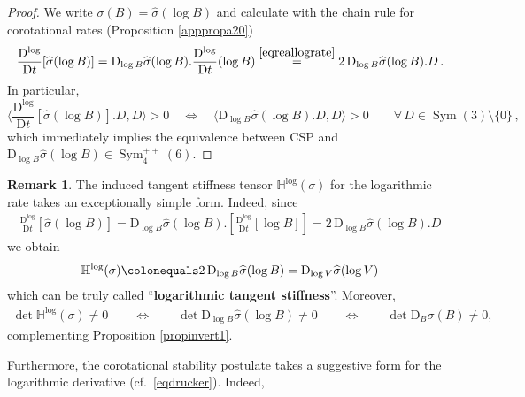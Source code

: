 \documentclass[10pt]{article}
\newcounter{theoremCounter}
\numberwithin{theoremCounter}{section}
\theoremstyle{plain}
\theoremstyle{definition}
\newtheorem{rem}[theoremCounter]{Remark}
\newcommand{\DD}{\mathrm{D}}
\DeclareMathOperator{\Sym}{Sym}
\def\H{\mathbb{H}}
\numberwithin{equation}{section}
\begin{document}
%
\begin{proof}
We write $\sigma(B) = \widehat \sigma(\log B)$ and calculate with the chain rule for corotational rates (Proposition \ref{apppropa20})
	\begin{align}
	\frac{\DD^{\log}}{\DD t}[\widehat \sigma(\log B)] = \DD_{\log B} \widehat \sigma (\log B). \frac{\DD^{\log}}{\DD t}(\log B) \overset{\eqref{eqreallograte}}{=} 2 \, \DD_{\log B} \widehat \sigma(\log B). D \, .
	\end{align}
In particular,
	\begin{equation}
	\langle \frac{\DD^{\log}}{\DD t}[\widehat \sigma(\log B)].D, D \rangle > 0 \quad\iff\quad \langle \DD_{\log B} \widehat \sigma(\log B). D , D \rangle > 0 \qquad\forall \, D \in \Sym(3) \! \setminus \! \{0\}
	\,,
	\end{equation}
which immediately implies the equivalence between CSP and $\DD_{\log B} \widehat \sigma(\log B) \in \Sym^{++}_4(6)$.
\end{proof}
%
\begin{rem}
The induced tangent stiffness tensor $\H^{\log}(\sigma)$ for the logarithmic rate takes an exceptionally simple form. Indeed, since
	\begin{align}
	\frac{\DD^{\log}}{\DD t}[\widehat \sigma(\log B)] = \DD_{\log B} \widehat \sigma(\log B).\!\left[ \frac{\DD^{\log}}{\DD t} [\log B] \right] = 2 \, \DD_{\log B} \widehat \sigma(\log B). D
	\end{align}
we obtain
	\begin{align}
	\H^{\log}(\sigma)\colonequals 2 \, \DD_{\log B} \widehat \sigma(\log B) = \DD_{\log V} \widehat \sigma(\log V)
	\end{align}
which can be truly called ``\textbf{logarithmic tangent stiffness}''. Moreover,
	\begin{align}
	\det \H^{\log}(\sigma) \neq 0 \qquad \iff \qquad \det \DD_{\log B} \widehat \sigma(\log B) \neq 0 \qquad \iff \qquad \det \DD_B \sigma(B) \neq 0,
	\end{align}
complementing Proposition \ref{propinvert1}.
\end{rem}
%
Furthermore, the corotational stability postulate takes a suggestive form for the logarithmic derivative (cf.~\eqref{eqdrucker}). Indeed,
\end{document}
